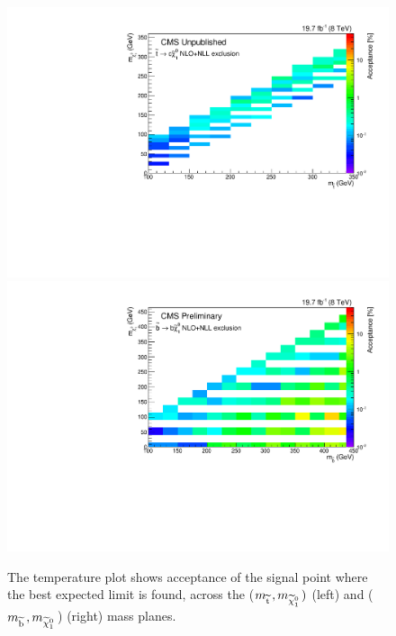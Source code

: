 \begin{figure}[!Hhtb]
  \begin{center}
  \includegraphics[scale=0.39]{Figures/sus13009/limitplots/plots/stop/optimal_stop_acceptance.pdf}
  \includegraphics[scale=0.39]{Figures/sus13009/limitplots/plots/sbottom/optimal_sbottom_acceptance.pdf}
  \caption{The temperature plot shows acceptance of the signal point where the best expected limit is found, across the ($m_{\widetilde{{\rm t}}\,}, m_{\widetilde{\chi}^{0}_{1}\,})$ (left) and ($m_{\widetilde{{\rm b}}\,},m_{\widetilde{\chi}^{0}_{1}\,}$) (right) mass planes.}
  \label{fig:optimalacc}
  \end{center}
\end{figure}

